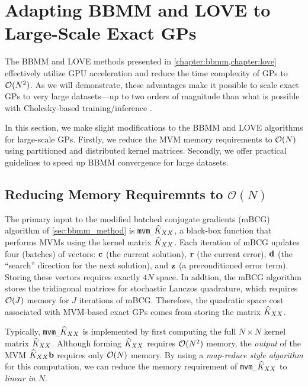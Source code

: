\section{Adapting BBMM and LOVE to Large-Scale Exact GPs}
\label{sec:largeexact_method}

The BBMM and LOVE methods presented in \cref{chapter:bbmm,chapter:love} effectively utilize GPU acceleration and reduce the time complexity of GPs to $\bigo{N^2}$.
As we will demonstrate, these advantages make it possible to scale exact GPs to very large datasets---up to two orders of magnitude than what is possible with Cholesky-based training/inference \cite{nguyen2019exact}.

In this section, we make slight modifications to the BBMM and LOVE algorithms for large-scale GPs.
Firstly, we reduce the MVM memory requirements to $\bigo{N}$ using partitioned and distributed kernel matrices.
Secondly, we offer practical guidelines to speed up BBMM convergence for large datasets.




\subsection{Reducing Memory Requiremnts to $\mathcal{O}(N)$}

The primary input to the modified batched conjugate gradients (mBCG) algorithm of \cref{sec:bbmm_method} is {\tt mvm\_$\widehat{K}_{XX}$}, a black-box function that performs MVMs using the kernel matrix $\widehat{K}_{XX}$.
Each iteration of mBCG updates four (batches) of vectors: $\mathbf{c}$ (the current solution), $\mathbf{r}$ (the current error), $\mathbf{d}$ (the ``search'' direction for the next solution), and $\mathbf{z}$ (a preconditioned error term).
Storing these vectors requires exactly $4N$ space.
In addtion, the mBCG algorithm stores the tridiagonal matrices for stochastic Lanczos quadrature, which requires $\bigo{J}$ memory for $J$ iterations of mBCG.
Therefore, the quadratic space cost associated with MVM-based exact GPs comes from storing the matrix $\widehat{K}_{XX}$.

Typically, {\tt mvm\_$\widehat{K}_{XX}$} is implemented by first computing the full $N \times N$ kernel matrix $\widehat{K}_{XX}$.
Although forming $\widehat{K}_{XX}$ requires $\bigo{N^2}$ memory, the \emph{output} of the MVM $\widehat{K}_{XX} \mathbf{b}$ requires only $\bigo{N}$ memory.
By using a \emph{map-reduce style algorithm} for this computation, we can reduce the memory requirement of {\tt mvm\_$\widehat{K}_{XX}$} to \emph{linear in $N$}.

